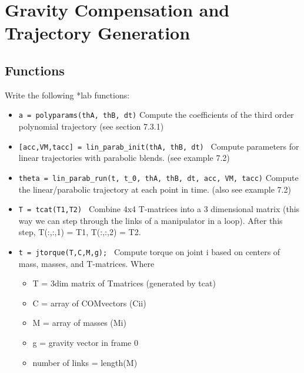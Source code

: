\documentclass{article}
\begin{document}
\newpage
\section{Gravity Compensation and Trajectory Generation}


\subsection{Functions}


Write the following *lab functions:

\begin{itemize}
  \item {\tt a = polyparams(thA, thB, dt)}   Compute the coefficients of the third order polynomial trajectory (see section 7.3.1)
  \item {\tt [acc,VM,tacc] = lin\_parab\_init(thA, thB, dt) }   Compute parameters for linear trajectories with parabolic blends. (see example 7.2)
  \item {\tt theta = lin\_parab\_run(t, t\_0, thA, thB, dt,  acc, VM, tacc)} Compute the linear/parabolic trajectory at each point in time.  (also see example 7.2)
  \item {\tt T = tcat(T1,T2) } Combine 4x4 T-matrices into a 3 dimensional matrix (this way we can step through the links of a manipulator in a loop). After this step, T(:,:,1) = T1, T(:,:,2) = T2.
  \item {\tt t = jtorque(T,C,M,g); } Compute torque on joint i based on centers of mass, masses, and T-matrices. Where
  \begin{itemize}
      \item T = 3dim matrix of Tmatrices (generated by tcat)
      \item C = array of COMvectors (Cii)
      \item M = array of masses (Mi)
      \item g = gravity vector in frame 0
      \item number of links = length(M)
  \end{itemize}
\end{itemize}
\end{document}
